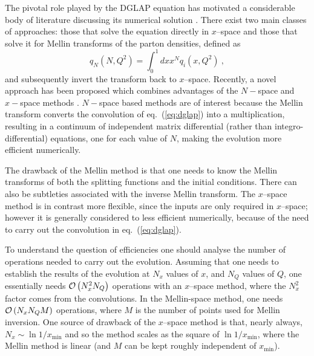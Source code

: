 \documentclass[12pt]{article}
\newcommand{\be}{\begin{equation}}
\newcommand{\ee}{\end{equation}}
\newcommand{\lp}{\left(}
\newcommand{\rp}{\right)}
\newcommand{\order}[1]{{\cal O}\left(#1\right)}
\newcommand{\AllDGLAP}{Botje,Schoeffel:1998tz,Pegasus,Pascaud:2001bi,Weinzierl:2002mv,Cafarella:2003jr,Cafarella:2005zj,Cafarella:2008du,GuzziThesis,nnpdf,Kosower:1997hg,Ratcliffe:2000kp}
\begin{document}
The pivotal role played by the DGLAP equation has motivated a
considerable body of literature discussing its numerical solution
\cite{\AllDGLAP}. There exist two main classes of approaches: those that
solve the equation directly in $x$--space and those that solve it for
Mellin transforms of the
parton densities, defined as
\be
q_{N}\lp N,Q^2\rp = \int_0^1 dx x^N q_i(x,Q^2) \ ,
\ee 
 and subsequently invert the transform back to
$x$--space.
 Recently, a novel approach has been proposed which combines
advantages of the $N-$space and $x-$space methods \cite{nnpdf}.
$N-$space based methods are of interest because the Mellin transform
converts the convolution of eq.~(\ref{eq:dglap}) into a multiplication,
resulting in a continuum of independent matrix differential (rather
than integro-differential) equations, one for each value of $N$,
making the evolution more efficient numerically.

The drawback of the Mellin method is that one needs to know the Mellin
transforms of both the splitting functions and the initial conditions.
There can also be subtleties associated with the inverse Mellin
transform.
%
The $x$--space method is in contrast more flexible, since the inputs
are only required in $x$--space; however it is generally considered to
less efficient numerically, because of the need to carry out the
convolution in eq.~(\ref{eq:dglap}).

To understand the question of efficiencies one should analyse the
number of operations needed to carry out the evolution. Assuming that
one needs to establish the results of the evolution at $N_x$ values of
$x$, and $N_Q$ values of $Q$, one essentially needs $\order{N_x^2
  N_Q}$ operations with an $x$--space method, where the $N_x^2$ factor
comes from the convolutions. In the Mellin-space method, one needs
$\order{N_x N_Q M}$ operations, where $M$ is the number of points used
for Mellin inversion. One source of drawback of the $x$--space method
is that, nearly always, $N_x \sim \ln 1/x_{\min}$ and so the method
scales as the square of $\ln 1/x_{\min}$, where the Mellin method is
linear (and $M$ can be kept roughly independent of $x_{\min}$). 
%
\end{document}
